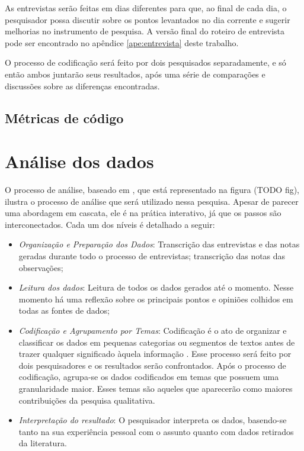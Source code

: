 As entrevistas serão feitas em dias diferentes para que, ao final de cada dia,
o pesquisador possa discutir sobre os pontos levantados no dia
corrente e sugerir melhorias no instrumento de pesquisa. A
versão final do roteiro de entrevista pode ser encontrado no apêndice 
\ref{ape:entrevista} deste trabalho.

O processo de codificação \cite{seaman} será feito por dois
pesquisados separadamente, e só então ambos juntarão seus resultados, após uma 
série de comparações e discussões sobre as diferenças encontradas.

\subsection{Métricas de código}
\label{sec:planejamento-metricas}



\section{Análise dos dados}
\label{sec:planejamento-analise}

O processo de análise, baseado em \cite{creswell}, que está representado na
figura (TODO fig), ilustra o processo de análise que será utilizado nessa
pesquisa. Apesar de parecer uma abordagem em cascata, ele é na prática 
interativo, já que os passos são interconectados. Cada um dos níveis é 
detalhado a seguir:

\begin{itemize}

	\item \textit{Organização e Preparação dos Dados}: Transcrição das entrevistas 
	e das notas geradas durante todo o processo de entrevistas; transcrição das
	notas das observações;
	
	\item \textit{Leitura dos dados}: Leitura de todos os dados gerados até o
	momento. Nesse momento há uma reflexão sobre os principais pontos e opiniões 
	colhidos em todas as fontes de dados;
	
	\item \textit{Codificação e Agrupamento por Temas}:	Codificação é o ato de
	organizar e classificar os dados em pequenas categorias ou segmentos de textos 
	antes de trazer qualquer significado àquela informação \cite{rossman}. Esse 
	processo será feito por dois pesquisadores e os resultados serão confrontados. 
	Após o processo de codificação, agrupa-se os dados codificados em temas que 
	possuem uma granularidade maior. Esses temas são aqueles que aparecerão como 
	maiores contribuições da pesquisa qualitativa.
	
	\item \textit{Interpretação do resultado}: O pesquisador interpreta os dados, 
	basendo-se tanto na sua experiência pessoal com o assunto quanto com dados 
	retirados da literatura.

\end{itemize}
 
